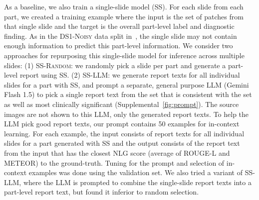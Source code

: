 \documentclass[11pt]{article}
\newcommand{\tthnoisy}{\textsc{DS1-Noisy}\xspace}
\newcommand{\randommodel}{\textsc{SS-Random}\xspace}
\newcommand{\llmmodel}{\textsc{SS-LLM}\xspace}
\begin{document}
As a baseline, we also train a single-slide model (SS). For each slide from each part, we created a training example where the input is the set of patches from that single slide and the target is the overall part-level label and diagnostic finding. As in the \tthnoisy data split in~\citet{ahmed2024pathalign}, the single slide may not contain enough information to predict this part-level information. We consider two approaches for repurposing this single-slide model for inference across multiple slides: (1) \randommodel: we randomly pick a slide per part and generate a part-level report using SS. (2) \llmmodel: we generate report texts for all individual slides for a part with SS, and prompt a separate, general purpose LLM (Gemini Flash 1.5) to pick a single report text from the set that is consistent with the set as well as most clinically significant (Supplemental~\autoref{fig:prompt}). The source images are not shown to this LLM, only the generated report texts. To help the LLM pick good report texts, our prompt contains 50 examples for in-context learning. For each example, the input consists of report texts for all individual slides for a part generated with SS and the output consists of the report text from the input that has the closest NLG score (average of ROUGE-L and METEOR) to the ground-truth. Tuning for the prompt and selection of in-context examples was done using the validation set. We also tried a variant of \textsc{SS-LLM}, where the LLM is prompted to combine the single-slide report texts into a part-level report text, but found it inferior to random selection.
\end{document}
